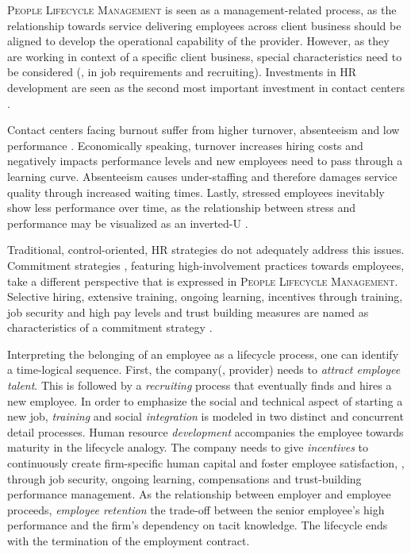	\textsc{People Lifecycle Management} is seen as a management-related process, as the relationship towards service delivering employees across client business should be aligned to develop the operational capability of the provider. However, as they are working in context of a specific client business, special characteristics need to be considered (\eg, in job requirements and recruiting). Investments in HR development are seen as the second most important investment in contact centers \citep{ccnet2016}.
	
	Contact centers facing burnout suffer from higher turnover, absenteeism and low performance \citep{Tuten_2004}. Economically speaking, turnover increases hiring costs and negatively impacts performance levels and new employees need to pass through a learning curve. Absenteeism causes under-staffing and therefore damages service quality through increased waiting times. Lastly, stressed employees inevitably show less performance over time, as the relationship between stress and performance may be visualized as an inverted-U \citep[]{Tuten_2004}.
	
	Traditional, control-oriented, HR strategies do not adequately address this issues. Commitment strategies  \citep{Batt2002, Batt_2002}, featuring high-involvement practices towards employees, take a different perspective that is expressed in \textsc{People Lifecycle Management}. Selective hiring, extensive training, ongoing learning, incentives through training, job security and high pay levels and trust building measures are named as characteristics of a commitment strategy \citep{Batt2002}. 
	
	Interpreting the belonging of an employee as a lifecycle process, one can identify a time-logical sequence. First, the company(\ie, provider) needs to \textit{attract employee talent}. This is followed by a \textit{recruiting} process that eventually finds and hires a new employee. In order to emphasize the social and technical aspect of starting a new job, \textit{training} and social \textit{integration} is modeled in two distinct and concurrent detail processes. Human resource \textit{development} accompanies the employee towards maturity in the lifecycle analogy. The company needs to give \textit{incentives} to continuously create firm-specific human capital and foster employee satisfaction, \eg, through job security, ongoing learning, compensations and trust-building performance management. As the relationship between employer and employee proceeds, \textit{employee retention} the trade-off between the senior employee's high performance and the firm's dependency on tacit knowledge. The lifecycle ends with the termination of the employment contract. 
	
